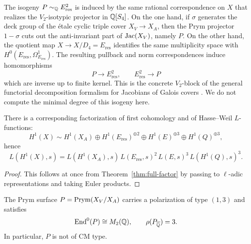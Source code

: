 \begin{remark}\label{rem:prym-correspondence}
The isogeny \(P\sim_{\mathbb{Q}}E_{\mathrm{res}}^2\) is induced by the same rational correspondence on \(X\) that realizes the \(V_2\)-isotypic projector in \(\mathbb{Q}[S_4]\). On the one hand, if \(\sigma\) generates the deck group of the \'etale cyclic triple cover \(X_V\to X_A\), then the Prym projector \(1-\sigma\) cuts out the anti-invariant part of \(\operatorname{Jac}(X_V)\), namely \(P\). On the other hand, the quotient map \(X\to X/D_4=E_{\mathrm{res}}\) identifies the same multiplicity space with \(H^0(E_{\mathrm{res}},\Omega_{E_{\mathrm{res}}}^1)\). The resulting pullback and norm correspondences induce homomorphisms
\[
P\longrightarrow E_{\mathrm{res}}^2,
\qquad
E_{\mathrm{res}}^2\longrightarrow P
\]
which are inverse up to finite kernel. This is the concrete \(V_2\)-block of the general functorial decomposition formalism for Jacobians of Galois covers \cite{LombardoEtAl2023}. We do not compute the minimal degree of this isogeny here.
\end{remark}

\begin{corollary}\label{cor:l-factor}
There is a corresponding factorization of first cohomology and of Hasse--Weil \(L\)-functions:
\[
H^1(X)\sim H^1(X_A)\oplus H^1(E_{\mathrm{res}})^{\oplus 2}\oplus H^1(E)^{\oplus 3}\oplus H^1(Q)^{\oplus 3},
\]
hence
\[
L(H^1(X),s)=L(H^1(X_A),s)\,L(E_{\mathrm{res}},s)^2\,L(E,s)^3\,L(H^1(Q),s)^3.
\]
\end{corollary}

\begin{proof}
This follows at once from Theorem~\ref{thm:full-factor} by passing to \(\ell\)-adic representations and taking Euler products.
\end{proof}

\begin{proposition}\label{prop:prym-end}
The Prym surface \(P=\operatorname{Prym}(X_V/X_A)\) carries a polarization of type \((1,3)\) and satisfies
\[
\operatorname{End}^0(P)\cong M_2(\mathbb{Q}),
\qquad
\rho(P_{\overline{\mathbb{Q}}})=3.
\]
In particular, \(P\) is not of CM type.
\end{proposition}

